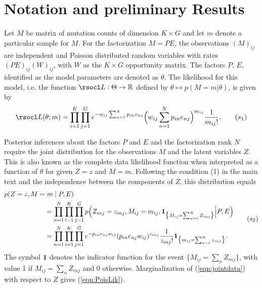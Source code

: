 \documentclass[11pt]{amsart}
\theoremstyle{definition}
\theoremstyle{remark}
\begin{document}
\tableofcontents 

\section{Notation and preliminary Results}
Let $M$ be matrix of mutation counts of dimension $K\times G$ and let
$m$ denote a particular sample for $M$. For the factorization $M=PE$,
the observations $(M)_{ij}$ are independent and Poisson distributed
random variables with rates $(PE)_{ij}(W)_{ij}$, with $W$ as the
$K\times G$ opportunity matrix. The factors $P$, $E$, identified as
the model parameters are denoted as $\theta$. The likelihood for this
model, i.e. the function $\rsocl L: \Theta \to \mathbb R$ defined by
$\theta \mapsto p(M=m|\theta)$, is given by
\begin{equation}
  \label{eqn:PoisLik}
   \rsocl L(\theta; m) 
   =
    \prod_{i=1}^K \prod_{j=1}^G e^{-w_{ij}\sum_{n=1}^{N}p_{in}e_{nj}}
    \Big(w_{ij}\sum_{n=1}^{N}p_{in}e_{nj}\Big)^{m_{ij}}
    \frac{1}{m_{ij}!}.\tag{$s_1$}
\end{equation}

Posterior inferences about the factors $P$ and $E$ and the
factorization rank $N$ require the joint distribution for the
observations $M$ and the latent variables $Z$. This is also known as
the complete data likelihood function when interpreted as a function
of  $\theta$ for given $Z=z$ and $M=m$. Following the condition 
(1) in the main text and the independence between
the components of $Z$, this distribution equals
\begin{equation}
   \label{eqn:jointdata}
 \begin{aligned}
    p(Z = z, M =&\ m \mid P, E) \notag\\
  &= 
    \prod_{n=1}^N\prod_{i=1}^K\prod_{j=1}^G p\Big(Z_{inj} = z_{inj},
    M_{ij} = m_{ij}, \mathbf{1}_{\big\{M_{ij} = \sum_{n=1}^N
      Z_{inj}\big\}} \Big| P, E\Big)  \notag\\ 
  &=
    \prod_{n=1}^N\prod_{i=1}^K\prod_{j=1}^G e^{-p_{in}e_{nj}w_{ij}}
    (p_{in}e_{nj}w_{ij})^{z_{inj}} \frac{1}{z_{inj}!}
    \mathbf{1}_{\big\{m_{ij} = \sum_{n=1}^N z_{inj}\big\}}.
 \end{aligned}
 \tag{$s_2$}
\end{equation}
The symbol $\mathbf{1}$ denotes the indicator function for the  
event $\big\{M_{ij} = \sum_n Z_{inj}\big\}$, with value 1 if $M_{ij} =  
\sum_n  Z_{inj}$ and 0 otherwise. Marginalization of
(\ref{eqn:jointdata}) with respect to $Z$ gives  (\ref{eqn:PoisLik}).
\end{document}
